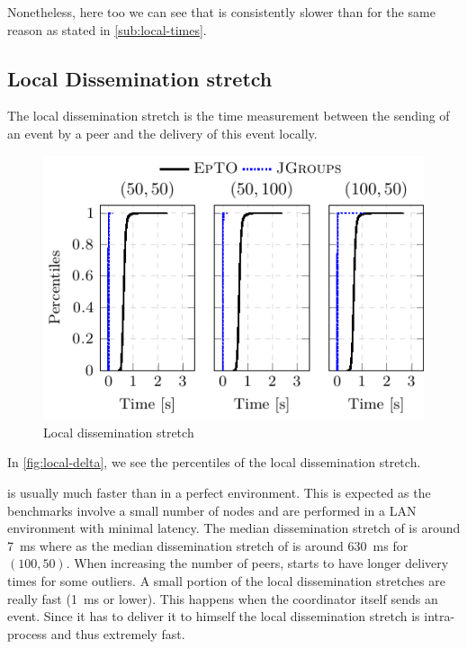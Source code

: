 Nonetheless, here too we can see that \epto is consistently slower than \jgroups for the same reason as stated in \autoref{sub:local-times}.
\subsection{Local Dissemination stretch}
The local dissemination stretch is the time measurement between the sending of an event by a peer and the delivery of this event locally.
 \begin{figure}[hpt]
 	\centering
 	\includegraphics[width=\linewidth]{figures/local-diss-stretch-nochurn.pdf}
 	\vspace{-2mm} 
 	\caption{Local dissemination stretch}
 	\vspace{-2mm}
 	\label{fig:local-delta}  
 \end{figure}
In \autoref{fig:local-delta}, we see the percentiles of the local dissemination stretch.
\par
\jgroups is usually much faster than \epto in a perfect environment. This is expected as the benchmarks involve a small number of nodes and are performed in a LAN environment with minimal latency. The median dissemination stretch of \jgroups is around \SI{7}{\milli\second} where as the median dissemination stretch of \epto is around \SI{630}{\milli\second} for $(100,50)$. When increasing the number of peers, \jgroups starts to have longer delivery times for some outliers. A small portion of the local dissemination stretches are really fast (\SI{1}{\milli\second} or lower). This happens when the coordinator itself sends an event. Since it has to deliver it to himself the local dissemination stretch is intra-process and thus extremely fast.


